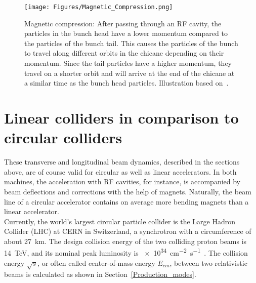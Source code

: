 \begin{figure}[h]
\centering
\texttt{[image: Figures/Magnetic\_Compression.png]}
\caption[Magnetic compression]{Magnetic compression: After passing through an RF cavity, the particles in the bunch head have a lower momentum compared to the particles of the bunch tail.
This causes the particles of the bunch to travel along different orbits in the chicane depending on their momentum.
Since the tail particles have a higher momentum, they travel on a shorter orbit and will arrive at the end of the chicane at a similar time as the bunch head particles.
Illustration based on~\cite[p. 75]{Bunching}.}
\label{fig:Magnetic_compression}
\end{figure}

\section{Linear colliders in comparison to circular colliders}
\label{AccPhysics:Linear-Circular}
These transverse and longitudinal beam dynamics, described in the sections above, are of course valid for circular as well as linear accelerators.
In both machines, the acceleration with RF cavities, for instance, is accompanied by beam deflections and corrections with the help of magnets.
Naturally, the beam line of a circular accelerator contains on average more bending magnets than a linear accelerator.\\
Currently, the world's largest circular particle collider is the Large Hadron Collider (LHC) at CERN in Switzerland, a synchrotron with a circumference of about \SI{27}{\kilo\meter}.
The design collision energy of the two colliding proton beams is \SI{14}{\TeV}, and its nominal peak luminosity \lumi is \SI{e34}{\centi\meter^{-2}\second^{-1}}~\cite[p. 3]{LHC_Paper}.
The collision energy $\sqrt{s}$, or often called center-of-mass energy $E_{cm}$, between two relativistic beams is calculated as shown in Section~\ref{Production_modes}.


